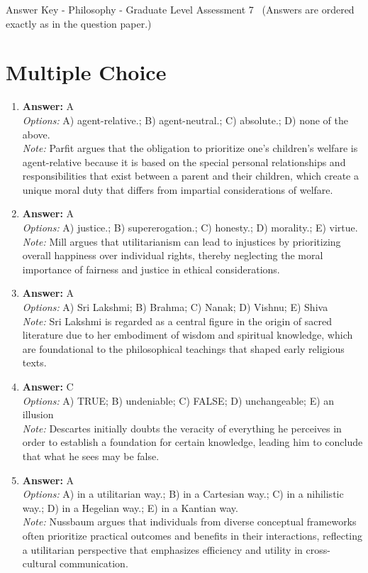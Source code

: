 \documentclass[12pt]{article}
\begin{document}
\begin{center}
Answer Key - Philosophy - Graduate Level Assessment 7 \
\small (Answers are ordered exactly as in the question paper.)
\end{center}

\section*{Multiple Choice}
\begin{enumerate}[label=\arabic*.]
\item \textbf{Answer:} A
\\ \textit{Options:} A) agent-relative.; B) agent-neutral.; C) absolute.; D) none of the above.
\\ \textit{Note:} Parfit argues that the obligation to prioritize one's children's welfare is agent-relative because it is based on the special personal relationships and responsibilities that exist between a parent and their children, which create a unique moral duty that differs from impartial considerations of welfare.
\item \textbf{Answer:} A
\\ \textit{Options:} A) justice.; B) supererogation.; C) honesty.; D) morality.; E) virtue.
\\ \textit{Note:} Mill argues that utilitarianism can lead to injustices by prioritizing overall happiness over individual rights, thereby neglecting the moral importance of fairness and justice in ethical considerations.
\item \textbf{Answer:} A
\\ \textit{Options:} A) Sri Lakshmi; B) Brahma; C) Nanak; D) Vishnu; E) Shiva
\\ \textit{Note:} Sri Lakshmi is regarded as a central figure in the origin of sacred literature due to her embodiment of wisdom and spiritual knowledge, which are foundational to the philosophical teachings that shaped early religious texts.
\item \textbf{Answer:} C
\\ \textit{Options:} A) TRUE; B) undeniable; C) FALSE; D) unchangeable; E) an illusion
\\ \textit{Note:} Descartes initially doubts the veracity of everything he perceives in order to establish a foundation for certain knowledge, leading him to conclude that what he sees may be false.
\item \textbf{Answer:} A
\\ \textit{Options:} A) in a utilitarian way.; B) in a Cartesian way.; C) in a nihilistic way.; D) in a Hegelian way.; E) in a Kantian way.
\\ \textit{Note:} Nussbaum argues that individuals from diverse conceptual frameworks often prioritize practical outcomes and benefits in their interactions, reflecting a utilitarian perspective that emphasizes efficiency and utility in cross-cultural communication.
\end{enumerate}
\end{document}
